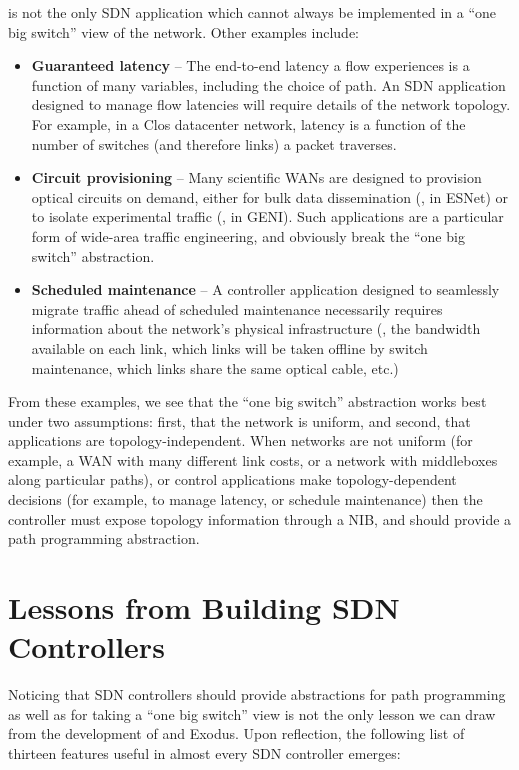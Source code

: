 \sys is not the only SDN application which cannot always be implemented in a ``one big switch''
view of the network. Other examples include:

\begin{itemize}
\item {\bf Guaranteed latency} -- The end-to-end latency a flow experiences is a function of
many variables, including the choice of path. An SDN application designed to manage flow
latencies will require details of the network topology. For example, in a Clos datacenter network,
latency is a function of the number of switches (and therefore links) a packet traverses.

\item {\bf Circuit provisioning} -- Many scientific WANs are designed to provision optical circuits
on demand, either for bulk data dissemination (\eg, in ESNet) or to isolate experimental traffic
(\eg, in GENI). Such applications are a particular form of wide-area traffic engineering, and
obviously break the ``one big switch'' abstraction.

\item {\bf Scheduled maintenance} -- A controller application designed to seamlessly migrate
traffic ahead of scheduled maintenance necessarily requires information about the network's
physical infrastructure (\eg, the bandwidth available on each link, which links will be taken
offline by switch maintenance, which links share the same optical cable, etc.)
\end{itemize}

From these examples, we see that the ``one big switch'' abstraction works best under two
assumptions: first, that the network is uniform, and second, that applications are topology-independent.
When networks are not uniform (for example, a WAN with many different link costs,
or a network with middleboxes along particular paths), or control applications
make topology-dependent decisions (for example, to manage latency, or schedule maintenance) then
the controller must expose topology information through a NIB, and should provide a path
programming abstraction.

\section{Lessons from Building SDN Controllers}
\label{sec:building-controllers}

Noticing that SDN controllers should provide abstractions for path programming as well as
for taking a ``one big switch'' view is not the only lesson we can draw from the development
of \sys and Exodus. Upon reflection, the following list of thirteen features useful in almost every
SDN controller emerges:

